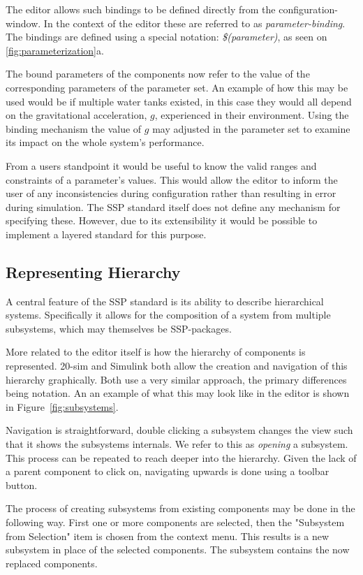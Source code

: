 The editor allows such bindings to be defined directly from the configuration-window.
In the context of the editor these are referred to as \emph{parameter-binding}.
The bindings are defined using a special notation: \emph{\$(parameter)}, as seen on \ref{fig:parameterization}a.

The bound parameters of the components now refer to the value of the corresponding parameters of the parameter set.
An example of how this may be used would be if multiple water tanks existed, in this case they would all depend on the gravitational acceleration, $g$, experienced in their environment.
Using the binding mechanism the value of $g$ may adjusted in the parameter set to examine its impact on the whole system's performance.

From a users standpoint it would be useful to know the valid ranges and constraints of a parameter's values. This would allow the editor to inform the user of any inconsistencies during configuration rather than resulting in error during simulation. The SSP standard itself does not define any mechanism for specifying these. However, due to its extensibility it would be possible to implement a layered standard for this purpose.


\subsection{Representing Hierarchy}

A central feature of the SSP standard is its ability to describe hierarchical systems.
Specifically it allows for the composition of a system from multiple subsystems, which may themselves be SSP-packages.

More related to the editor itself is how the hierarchy of components is represented.
20-sim and Simulink both allow the creation and navigation of this hierarchy graphically.
Both use a very similar approach, the primary differences being notation.
An an example of what this may look like in the editor is shown in Figure~\ref{fig:subsystems}.



Navigation is straightforward, double clicking a subsystem changes the view such that it shows the subsystems internals.
We refer to this as \emph{opening} a subsystem.
This process can be repeated to reach deeper into the hierarchy.
Given the lack of a parent component to click on, navigating upwards is done using a toolbar button.

The process of creating subsystems from existing components may be done in the following way.
First one or more components are selected, then the "Subsystem from Selection" item is chosen from the context menu.
This results is a new subsystem in place of the selected components.
The subsystem contains the now replaced components.


